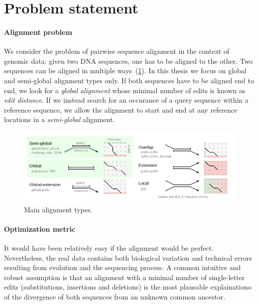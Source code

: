 \section*{Problem statement}

\paragraph{Alignment problem}
We consider the problem of pairwise sequence alignment in the context of genomic
data: given two DNA sequences, one has to be aligned to the other. Two sequences
can be aligned in multiple ways~(\cref{fig:alignment-types}). In this thesis we
focus on global and semi-global alignment types only. If both sequences have to
be aligned end to end, we look for a \emph{global alignment} whose minimal
number of edits is known as \emph{edit distance}. If we instead search for an
occurance of a query sequence within a reference sequence, we allow the
alignment to start and end at any reference locations in a \emph{semi-global}
alignment.

\begin{figure}[t]  %
    \includegraphics[width=\textwidth]{alignment-types-thesis.pdf}
	\caption[Main alignment types]{Main alignment types.}
    \label{fig:alignment-types}
\end{figure}

\paragraph{Optimization metric}
It would have been relatively easy if the alignment would be perfect.
Nevertheless, the real data contains both biological variation and technical
errors resulting from evolution and the sequencing process. A common intuitive
and robust assumption is that an alignment with a minimal number of
single-letter edits (substitutions, insertions and deletions) is the most
plausable explainationo of the divergence of both sequences from an unknown
common ancestor.

